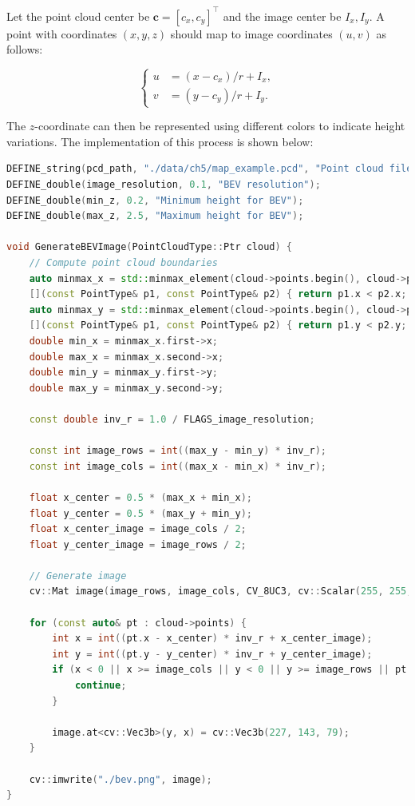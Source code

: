 Let the point cloud center be $\bm{c}=[c_x, c_y]^\top$ and the image center be $I_x, I_y$. A point with coordinates $(x, y, z)$ should map to image coordinates $(u, v)$ as follows:  

\begin{equation}\label{key}  
	\left\{  
	\begin{array}{ll}  
		u &= (x-c_x)/r + I_x, \\  
		v &= (y-c_y)/r + I_y.  
	\end{array}\right.  
\end{equation}  

The $z$-coordinate can then be represented using different colors to indicate height variations. The implementation of this process is shown below:  

\begin{lstlisting}[language=c++,caption=src/ch5/pcd\_to\_bird\_eye.cc]  
DEFINE_string(pcd_path, "./data/ch5/map_example.pcd", "Point cloud file path");  
DEFINE_double(image_resolution, 0.1, "BEV resolution");  
DEFINE_double(min_z, 0.2, "Minimum height for BEV");  
DEFINE_double(max_z, 2.5, "Maximum height for BEV");  

void GenerateBEVImage(PointCloudType::Ptr cloud) {  
	// Compute point cloud boundaries  
	auto minmax_x = std::minmax_element(cloud->points.begin(), cloud->points.end(),  
	[](const PointType& p1, const PointType& p2) { return p1.x < p2.x; });  
	auto minmax_y = std::minmax_element(cloud->points.begin(), cloud->points.end(),  
	[](const PointType& p1, const PointType& p2) { return p1.y < p2.y; });  
	double min_x = minmax_x.first->x;  
	double max_x = minmax_x.second->x;  
	double min_y = minmax_y.first->y;  
	double max_y = minmax_y.second->y;  
	
	const double inv_r = 1.0 / FLAGS_image_resolution;  
	
	const int image_rows = int((max_y - min_y) * inv_r);  
	const int image_cols = int((max_x - min_x) * inv_r);  
	
	float x_center = 0.5 * (max_x + min_x);  
	float y_center = 0.5 * (max_y + min_y);  
	float x_center_image = image_cols / 2;  
	float y_center_image = image_rows / 2;  
	
	// Generate image  
	cv::Mat image(image_rows, image_cols, CV_8UC3, cv::Scalar(255, 255, 255));  
	
	for (const auto& pt : cloud->points) {  
		int x = int((pt.x - x_center) * inv_r + x_center_image);  
		int y = int((pt.y - y_center) * inv_r + y_center_image);  
		if (x < 0 || x >= image_cols || y < 0 || y >= image_rows || pt.z < FLAGS_min_z || pt.z > FLAGS_max_z) {  
			continue;  
		}  
		
		image.at<cv::Vec3b>(y, x) = cv::Vec3b(227, 143, 79);  
	}  
	
	cv::imwrite("./bev.png", image);  
}  
\end{lstlisting}  

